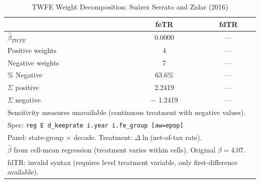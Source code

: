 \begin{table}[htbp]
\centering
\caption{TWFE Weight Decomposition: Su\'{a}rez Serrato and Zidar (2016)}
\label{tab:ssz_weights}
\begin{tabular}{lcc}
\hline\hline
 & feTR & fdTR \\
\hline
$\hat{\beta}_{TWFE}$ &    0.0000 & --- \\
Positive weights & 4 & --- \\
Negative weights & 7 & --- \\
\% Negative &  63.6\% & --- \\
$\Sigma$ positive &    2.2419 & --- \\
$\Sigma$ negative & $-$   1.2419 & --- \\
\hline
\multicolumn{3}{l}{\footnotesize Sensitivity measures unavailable (continuous treatment with negative values).} \\
\hline
\multicolumn{3}{l}{\footnotesize Spec: \texttt{reg E d\_keeprate i.year i.fe\_group [aw=epop]}} \\
\multicolumn{3}{l}{\footnotesize Panel: state-group $\times$ decade. Treatment: $\Delta\ln$(net-of-tax rate).} \\
\multicolumn{3}{l}{\footnotesize $\hat\beta$ from cell-mean regression (treatment varies within cells). Original $\beta=4.07$.} \\
\multicolumn{3}{l}{\footnotesize fdTR: invalid syntax (requires level treatment variable, only first-difference available).} \\
\hline\hline
\end{tabular}
\end{table}
